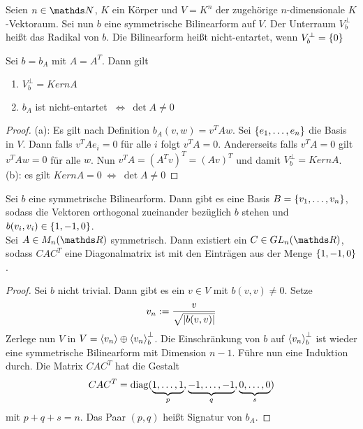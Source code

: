 			\begin{definition}
				Seien $n\in\SN$, $K$ ein Körper und $V=K^n$ der zugehörige $n$-dimensionale $K$-Vektoraum. 
				Sei nun $b$ eine symmetrische Bilinearform auf $V$.
				Der Unterraum $V_b^\perp$ heißt das Radikal von $b$.
				Die Bilinearform heißt nicht-entartet, wenn $V_b^\perp = \left\{ 0 \right\}$
			\end{definition}

			\begin{lemma}
				Sei $b=b_A$ mit $A=A^T$.
				Dann gilt
				\begin{enumerate}[label = \normalfont (\alph*)]
					\item $V_b^\perp = Kern A$
					\item $b_A$ ist nicht-entartet $\ \Leftrightarrow \ \det A \neq 0$
				\end{enumerate}
			\end{lemma}
			\begin{proof}
				(a): Es gilt nach Definition $b_A(v,w) = v^TAw$.
				Sei $\left\{ e_1,\ldots,e_n \right\}$ die Basis in $V$.
				Dann falls $v^TAe_i = 0$ für alle $i$ folgt $v^TA = 0$.
				Andererseits falls $v^TA = 0$ gilt $v^TAw = 0$ für alle $w$.
				Nun $v^TA = (A^Tv)^T = (Av)^T$ und damit $V_b^\perp = Kern A$.\\
				(b): es gilt $Kern A = 0 \ \Leftrightarrow \ \det A \neq 0$ 
			\end{proof}

			\begin{theorem}
				Sei $b$ eine symmetrische Bilinearform. Dann gibt es eine Basis
				$B=\left\{ v_1,\ldots,v_n \right\}$, sodass die Vektoren orthogonal zueinander bezüglich $b$ stehen und $b(v_i,v_i)\in\left\{ 1,-1,0 \right\}$.\\
				Sei $A\in M_n(\SR)$ symmetrisch. Dann existiert ein $C\in GL_n(\SR)$, sodass $CAC^T$ eine Diagonalmatrix ist mit den Einträgen aus der Menge $\left\{ 1,-1,0 \right\}$.
			\end{theorem}
			\begin{proof}
				Sei $b$ nicht trivial.
				Dann gibt es ein $v\in V$ mit $b(v,v)\neq 0$.
				Setze
				\[ v_n := \frac{v}{\sqrt{\left\vert b(v,v) \right\vert}} \]
				Zerlege nun $V$ in $V = \left\langle v_n \right\rangle \oplus \left\langle v_n \right\rangle_b^\perp$.
				Die Einschränkung von $b$ auf $\left\langle v_n \right\rangle_b^\perp$ ist wieder eine symmetrische Bilinearform mit Dimension $n-1$.
				Führe nun eine Induktion durch.
				Die Matrix $CAC^T$ hat die Gestalt
				\[ CAC^T = \operatorname{diag}(\underbrace{1,\ldots,1}_{p}, \underbrace{-1,\ldots,-1}_{q},\underbrace{0,\ldots,0}_{s}) \]
				mit $p+q+s=n$. Das Paar $(p,q)$ heißt Signatur von $b_A$.
			\end{proof}

